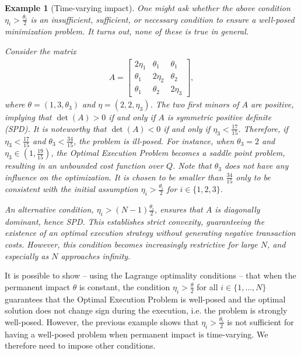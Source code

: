 \documentclass[final,3p,authoryear,12pt]{elsarticle}
\newtheorem{remark}{Remark}
\newtheorem{example}{Example}
\begin{document}
\begin{example}[Time-varying impact]
\label{example:_TV_impact}
One might ask whether the above condition $\eta_{{i}}>\frac{\theta_{{i}}}{2}$ is an insufficient, sufficient, or necessary condition to ensure a well-posed minimization problem. It turns out, none of these is true in general.

Consider the matrix
\begin{eqnarray}
    A = \begin{bmatrix}
                2\eta_{1} & \theta_{1} & \theta_{1} \\
                \theta_{1} & 2\eta_{2} & \theta_{2}\\
                \theta_{1} & \theta_{2} & 2\eta_{3}
            \end{bmatrix},
\end{eqnarray}
where $\theta=(1,3,\theta_{3})$ and $\eta = (2,2,\eta_{3})$. The two first minors
of $A$ are positive, implying that $\det(A) > 0$ if and only if $A$ is
symmetric positive definite (SPD). It is noteworthy that $\det(A) < 0$ if and
only if $\eta_{3} < \frac{17}{15}$. Therefore, if $\eta_{3} < \frac{17}{15}$
and $\theta_{3} < \frac{34}{15}$, the problem is ill-posed. For instance, when
$\theta_{3}=2$ and $\eta_{3} \in (1,\frac{19}{15})$, the Optimal Execution
Problem becomes a saddle point problem, resulting in an unbounded cost function
over $Q$. Note that $\theta_{3}$ does not have any influence on the
optimization. It is chosen to be smaller than $\frac{34}{15}$ only to be
consistent with the initial assumption $\eta_{{i}}>\frac{\theta_{{i}}}{2}$ for
$i\in\{1,2,3\}$.  

An alternative condition, $\eta_{{i}}>(N-1)\frac{\theta_i}{2}$, ensures that $A$ is diagonally dominant, hence SPD. This establishes strict convexity, guaranteeing the existence of an optimal execution strategy without generating negative transaction costs. However, this condition becomes increasingly restrictive for large $N$, and especially as $N$ approaches infinity. %
\end{example}

It is possible to show -- using the Lagrange optimality conditions -- that when
the permanent impact $\theta$ is constant, the condition
$\eta_{i}>\frac{\theta}{2}$ for all $i\in \{1,\dots,N\}$ guarantees that the
Optimal Execution Problem is well-posed and the optimal solution does not
change sign during the execution, i.e. the problem is strongly well-posed.
However, the previous example shows that $\eta_{i}>\frac{\theta_{i}}{2}$ is not
sufficient for having a well-posed problem when permanent impact is
time-varying. We therefore need to impose other conditions.
\end{document}
